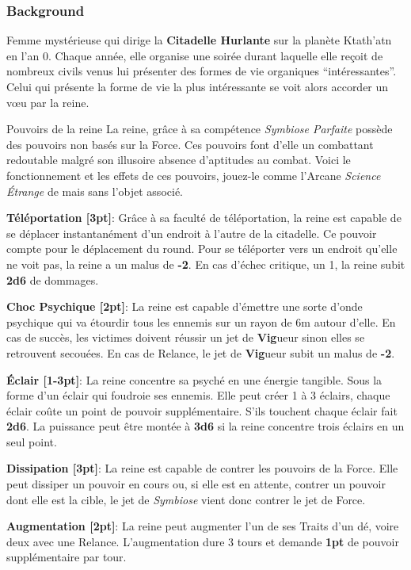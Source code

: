 \subsubsection{Background}
Femme mystérieuse qui dirige la \textbf{Citadelle Hurlante} sur la planète Ktath’atn en l’an 0. Chaque année, elle organise une soirée durant laquelle elle reçoit de nombreux civils venus lui présenter des formes de vie organiques “intéressantes”. Celui qui présente la forme de vie la plus intéressante se voit alors accorder un vœu par la reine.
\newpage
\begin{paperbox}{Pouvoirs de la reine}
La reine, grâce à sa compétence \textit{Symbiose Parfaite} possède des pouvoirs non basés sur la Force. Ces pouvoirs font d’elle un combattant redoutable malgré son illusoire absence d’aptitudes au combat. Voici le fonctionnement et les effets de ces pouvoirs, jouez-le comme l’Arcane \textit{Science \'Etrange} de  mais sans l’objet associé.
\bigbreak
\begin{rebelist}
    \item \textbf{Téléportation [3pt]}: Grâce à sa faculté de téléportation, la reine est capable de se déplacer instantanément d’un endroit à l’autre de la citadelle. Ce pouvoir compte pour le déplacement du round. Pour se téléporter vers un endroit qu’elle ne voit pas, la reine a un malus de \textbf{-2}. En cas d’échec critique, un 1, la reine subit \textbf{2d6} de dommages.
    \item \textbf{Choc Psychique [2pt]}: La reine est capable d’émettre une sorte d’onde psychique qui va étourdir tous les ennemis sur un rayon de 6m autour d’elle. En cas de succès, les victimes doivent réussir un jet de \textbf{Vig}ueur sinon elles se retrouvent secouées. En cas de Relance, le jet de \textbf{Vig}ueur subit un malus de \textbf{-2}.
    \item \textbf{\'Eclair [1-3pt]}: La reine concentre sa psyché en une énergie tangible. Sous la forme d’un éclair qui foudroie ses ennemis. Elle peut créer 1 à 3 éclairs, chaque éclair coûte un point de pouvoir supplémentaire. S’ils touchent chaque éclair fait \textbf{2d6}. La puissance peut être montée à \textbf{3d6} si la reine concentre trois éclairs en un seul point.
    \item \textbf{Dissipation [3pt]}: La reine est capable de contrer les pouvoirs de la Force. Elle peut dissiper un pouvoir en cours ou, si elle est en attente, contrer un pouvoir dont elle est la cible, le jet de \textit{Symbiose} vient donc contrer le jet de Force.
    \item \textbf{Augmentation [2pt]}: La reine peut augmenter l’un de ses Traits d’un dé, voire deux avec une Relance. L’augmentation dure 3 tours et demande \textbf{1pt} de pouvoir supplémentaire par tour.
\end{rebelist}
\end{paperbox}
\newpage

